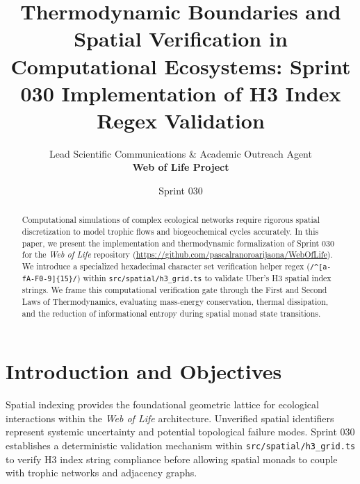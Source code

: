 \documentclass[11pt, a4paper]{article}
\title{\textbf{Thermodynamic Boundaries and Spatial Verification in Computational Ecosystems: Sprint 030 Implementation of H3 Index Regex Validation}}
\author{Lead Scientific Communications \& Academic Outreach Agent \\ \textbf{Web of Life Project}}
\date{Sprint 030}
\begin{document}
\maketitle

\begin{abstract}
Computational simulations of complex ecological networks require rigorous spatial discretization to model trophic flows and biogeochemical cycles accurately. In this paper, we present the implementation and thermodynamic formalization of Sprint 030 for the \textit{Web of Life} repository (\url{https://github.com/pascalranoroarijaona/WebOfLife}). We introduce a specialized hexadecimal character set verification helper regex (\texttt{/^[a-fA-F0-9]\{15\}/}) within \texttt{src/spatial/h3\_grid.ts} to validate Uber's H3 spatial index strings. We frame this computational verification gate through the First and Second Laws of Thermodynamics, evaluating mass-energy conservation, thermal dissipation, and the reduction of informational entropy during spatial monad state transitions.
\end{abstract}

\section{Introduction and Objectives}
Spatial indexing provides the foundational geometric lattice for ecological interactions within the \textit{Web of Life} architecture. Unverified spatial identifiers represent systemic uncertainty and potential topological failure modes. Sprint 030 establishes a deterministic validation mechanism within \texttt{src/spatial/h3\_grid.ts} to verify H3 index string compliance before allowing spatial monads to couple with trophic networks and adjacency graphs.
\end{document}
